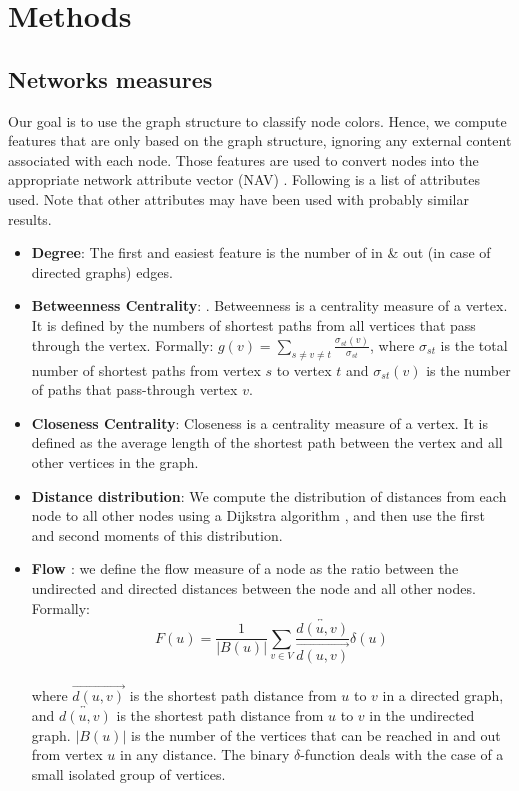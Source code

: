 \section{Methods}

\subsection*{Networks measures}
Our goal is to use the graph structure to classify node colors. Hence, we compute features that are only based on the graph structure, ignoring any external content associated with each node. Those features are used to convert nodes into the appropriate network attribute vector (NAV) \cite{naaman2019edge}. Following is a list of attributes used. Note that other attributes may have been used with probably similar results.
\begin{itemize}
\item   \textbf{Degree}: The first and easiest feature is the number of in \& out (in case of directed graphs) edges. 
\item   \textbf{Betweenness Centrality}: \cite{everett1999centrality}. Betweenness is a centrality measure of a vertex. It is defined by the numbers of shortest paths from all vertices that pass through the vertex. Formally: $g(v)=\sum_{s\neq v\neq t}\frac{\sigma_{st}(v)}{\sigma_{st}}$, where $\sigma_{st}$ is the total number of shortest paths from vertex $s$ to vertex $t$ and $\sigma_{st}(v)$ is the number of paths that pass-through vertex $v$. 
\item   \textbf{Closeness Centrality}: Closeness is a centrality measure of a vertex. It is defined as the average length of the shortest path between the vertex and all other vertices in the graph.
\item   \textbf{Distance distribution}: We compute the distribution of distances from each node to all other nodes using a Dijkstra algorithm \cite{dijkstra1959note}, and then use the first and second moments of this distribution. 
\item   \textbf{Flow \cite{rosen2014directionality}}: we define the flow measure of a node as the ratio between the undirected and directed distances between the node and all other nodes. Formally:
$$F(u)=\frac{1}{|B(u)|}\sum_{v\in V}\frac{\overleftrightarrow{d(u, v)}}{\overrightarrow{d(u, v)}}\delta(u)$$
\\where $\overrightarrow{d(u,v)}$ is the shortest path distance from $u$ to $v$ in a directed graph, and $\overleftrightarrow{d(u,v)}$ is the shortest path distance from $u$ to $v$ in the undirected graph. $|B(u)|$ is the number of the vertices that can be reached in and out from vertex $u$ in any distance. The binary $\delta$-function deals with the case of a small isolated group of vertices.

\end{itemize}
